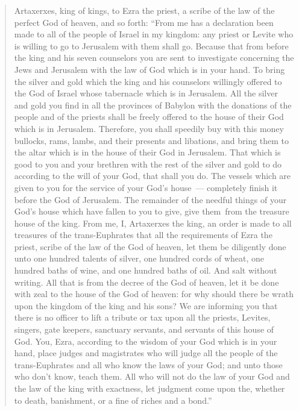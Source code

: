 \begin{quote}
  \begin{inparaenum}\setcounter{enumi}{11}
     Artaxerxes, king of kings, to Ezra the priest, a scribe of the law of the perfect God of heaven, and so forth:%
     ``From me has a declaration been made to all of the people of Israel in my kingdom: any priest or Levite who is willing to go to Jerusalem with them shall go.%
     Because that from before the king and his seven counselors you are sent to investigate concerning the Jews and Jerusalem with the law of God which is in your hand.%
     To bring the silver and gold which the king and his counselors willingly offered to the God of Israel whose tabernacle which is in Jerusalem.%
     All the silver and gold you find in all the provinces of Babylon with the donations of the people and of the priests shall be freely offered to the house of their God which is in Jerusalem.%
     Therefore, you shall speedily buy with this money bullocks, rams, lambs, and their presents and libations, and bring them to the altar which is in the house of their God in Jerusalem.%
     That which is good to you and your brethren with the rest of the silver and gold to do according to the will of your God, that shall you do.%
     The vessels which are given to you for the service of your God's house~--- completely finish it before the God of Jerusalem.%
     The remainder of the needful things of your God's house which have fallen to you to give, give them\understood{}\ from the treasure house of the king.%
     From me, I, Artaxerxes the king, an order is made to all treasures of the trans-Euphrates that all the requirements of Ezra the priest, scribe of the law of the God of heaven, let them be diligently done%
     unto one hundred talents of silver, one hundred cords of wheat, one hundred baths of wine, and one hundred baths of oil. And salt without writing.%
     All that is from the decree of the God of heaven, let it be done with zeal to the house of the God of heaven: for why should there be wrath upon the kingdom of the king and his sons?%
     We are informing you that there is no officer to lift a tribute or tax upon all the priests, Levites, singers, gate keepers, sanctuary servants, and servants of this house of God.%
     You, Ezra, according to the wisdom of your God which is in your hand, place judges and magistrates who will judge all the people of the trans-Euphrates and all who know the laws of your God; and unto those who don't know, teach them.%
     All who will not do the law of your God and the law of the king with exactness, let judgment come upon the, whether to death, banishment, or a fine of riches and a bond.''%
  \end{inparaenum}
\end{quote}
